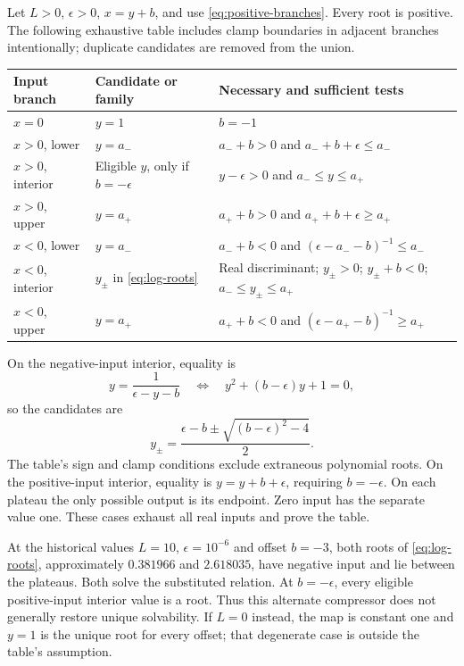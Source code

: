 \documentclass[11pt,a4paper]{article}
\theoremstyle{definition}
\numberwithin{equation}{section}
\begin{document}
Let $L>0$, $\epsilon>0$, $x=y+b$, and use
\eqref{eq:positive-branches}. Every root is positive.
The following exhaustive table includes clamp boundaries in adjacent
branches intentionally; duplicate candidates are removed from the union.

\begin{center}
\small
\renewcommand{\arraystretch}{1.28}
\begin{tabularx}{\textwidth}{@{}p{}p{}Y@{}}
\toprule
Input branch & Candidate or family & Necessary and sufficient tests\\
\midrule
$x=0$ & $y=1$ & $b=-1$\\
$x>0$, lower & $y=a_-$ & $a_-+b>0$ and $a_-+b+\epsilon\leq a_-$\\
$x>0$, interior & Eligible $y$, only if $b=-\epsilon$ &
 $y-\epsilon>0$ and $a_-\leq y\leq a_+$\\
$x>0$, upper & $y=a_+$ & $a_++b>0$ and $a_++b+\epsilon\geq a_+$\\
$x<0$, lower & $y=a_-$ & $a_-+b<0$ and $(\epsilon-a_--b)^{-1}\leq a_-$\\
$x<0$, interior & $y_\pm$ in \eqref{eq:log-roots} &
 Real discriminant; $y_\pm>0$; $y_\pm+b<0$; $a_-\leq y_\pm\leq a_+$\\
$x<0$, upper & $y=a_+$ & $a_++b<0$ and $(\epsilon-a_+-b)^{-1}\geq a_+$\\
\bottomrule
\end{tabularx}
\end{center}

On the negative-input interior, equality is
\[
 y=\frac1{\epsilon-y-b}
 \quad\Longleftrightarrow\quad y^2+(b-\epsilon)y+1=0,
\]
so the candidates are
\begin{equation}
 y_\pm=\frac{\epsilon-b\pm\sqrt{(b-\epsilon)^2-4}}2.
 \label{eq:log-roots}
\end{equation}
The table's sign and clamp conditions exclude extraneous polynomial
roots. On the positive-input interior, equality is
$y=y+b+\epsilon$, requiring $b=-\epsilon$.
On each plateau the only possible output is its endpoint.
Zero input has the separate value one. These cases exhaust all real
inputs and prove the table.

At the historical values $L=10$, $\epsilon=10^{-6}$ and offset $b=-3$,
both roots of \eqref{eq:log-roots}, approximately $0.381966$ and
$2.618035$, have negative input and lie between the plateaus.
Both solve the substituted relation.
At $b=-\epsilon$, every eligible positive-input interior value is a root.
Thus this alternate compressor does not generally restore unique
solvability. If $L=0$ instead, the map is constant one and $y=1$ is
the unique root for every offset; that degenerate case is outside the
table's assumption.
\end{document}
